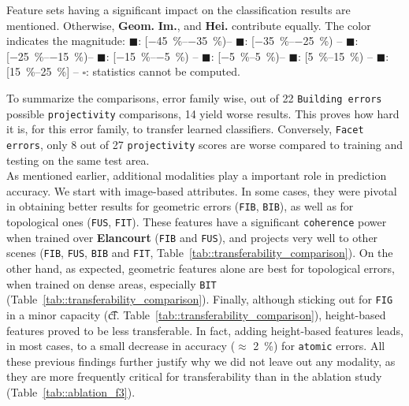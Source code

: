 \begin{table}[htbp]
{                Feature sets having a significant impact on the classification results are mentioned.
                Otherwise, \textbf{Geom.} \textbf{Im.}, and \textbf{Hei.} contribute equally.
                The color indicates the magnitude: \textcolor{LOSS3545}{$\blacksquare$}: [\SIrange[range-phrase={, }]{-45}{-35}{\percent})--
                \textcolor{LOSS2535}{$\blacksquare$}: [\SIrange[range-phrase={, }]{-35}{-25}{\percent}) --
                \textcolor{LOSS1525}{$\blacksquare$}: [\SIrange[range-phrase={, }]{-25}{-15}{\percent})--
                \textcolor{LOSS0515}{$\blacksquare$}: [\SIrange[range-phrase={, }]{-15}{-5}{\percent}) --
                \textcolor{STBL}{$\blacksquare$}: [\SIrange[range-phrase={, }]{-5}{5}{\percent})--
                \textcolor{GAIN0515}{$\blacksquare$}: [\SIrange[range-phrase={, }]{5}{15}{\percent}) --
                \textcolor{GAIN1525}{$\blacksquare$}: [\SIrange[range-phrase={, }]{15}{25}{\percent}] --
                $\square$: statistics cannot be computed.
            }
        \end{table}


        To summarize the comparisons, error family wise, out of 22 \texttt{Building errors} possible \texttt{projectivity} comparisons, 14 yield worse results.
        This proves how hard it is, for this error family, to transfer learned classifiers.
        Conversely, \texttt{Facet errors}, only 8 out of 27 \texttt{projectivity} scores are worse compared to training and testing on the same test area.\\

        As mentioned earlier, additional modalities play a important role in prediction accuracy.
        We start with image-based attributes.
        In some cases, they were pivotal in obtaining better results for geometric errors (\texttt{FIB}, \texttt{BIB}), as well as for topological ones (\texttt{FUS}, \texttt{FIT}).
        These features have a significant \texttt{coherence} power when trained over \textbf{Elancourt} (\texttt{FIB} and \texttt{FUS}), and projects very well to other scenes (\texttt{FIB}, \texttt{FUS}, \texttt{BIB} and \texttt{FIT}, Table~\ref{tab::transferability_comparison}).
        On the other hand, as expected, geometric features alone are best for topological errors, when trained on dense areas, especially \texttt{BIT} (Table~\ref{tab::transferability_comparison}).
        Finally, although sticking out for \texttt{FIG} in a minor capacity (\t{cf.} Table~\ref{tab::transferability_comparison}), height-based features proved to be less transferable.
        In fact, adding height-based features leads, in most cases, to a small decrease in accuracy ($\approx$ \SI{2}{\percent}) for \texttt{atomic} errors.
        All these previous findings further justify why we did not leave out any modality, as they are more frequently critical for transferability than in the ablation study (Table~\ref{tab::ablation_f3}).\\

